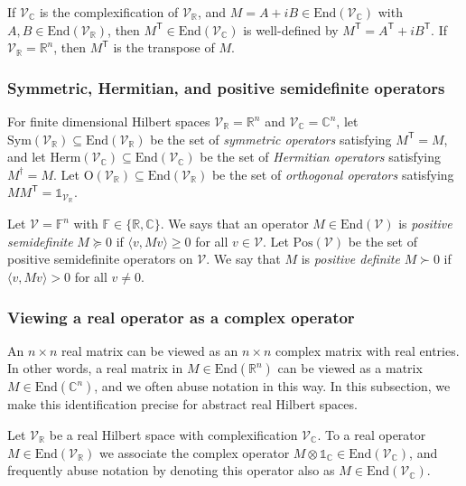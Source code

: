 \documentclass[11pt]{article}
\numberwithin{theorem}{section}
\theoremstyle{definition}
\renewcommand{\t}{{\scriptscriptstyle\mathsf{T}}}
\newcommand{\ip}[2]{\langle #1 , #2\rangle}
\newcommand{\I}{\mathds{1}}
\newcommand{\setft}[1]{\mathrm{#1}}
\newcommand{\Pos}{\setft{Pos}}
\newcommand{\Herm}{\setft{Herm}}
\newcommand{\Sym}{\setft{Sym}}
\newcommand{\complex}{\mathbb{C}}
\newcommand{\field}{\mathbb{F}}
\newcommand{\real}{\mathbb{R}}
\newcommand\V{\mathcal{V}}
\newcommand{\End}{\setft{End}}
\newcommand{\dg}{\dagger}
\newcommand{\Vc}{\V_{\complex}}
\newcommand{\Vr}{\V_{\real}}
\begin{document}
If $\Vc$ is the complexification of $\Vr$, and $M=A+iB \in \End(\Vc)$ with $A,B \in \End(\Vr)$, then $M^{\t} \in \End(\Vc)$ is well-defined by $M^{\t}=A^{\t}+iB^{\t}$. If $\Vr=\real^n$, then $M^{\t}$ is the transpose of $M$.



\subsubsection*{Symmetric, Hermitian, and positive semidefinite operators}

For finite dimensional Hilbert spaces $\Vr=\real^n$ and $ \Vc=\complex^n$, let $\Sym(\Vr) \subseteq \End(\Vr)$ be the set of \textit{symmetric operators} satisfying $M^{\t}=M$, and let $\Herm(\Vc) \subseteq \End(\Vc)$ be the set of \textit{Hermitian operators} satisfying $M^{\dg}=M$. Let $\setft{O}(\Vr) \subseteq \End(\Vr)$ be the set of \textit{orthogonal operators} satisfying $M M^{\t}=\I_{\Vr}$.



Let $\V=\field^n$ with $\field \in \{\real, \complex\}$. We says that an operator $M\in \End(\V)$ is \textit{positive semidefinite} $M \succeq 0$ if $\ip{v}{Mv} \geq 0$ for all $v \in \V$. Let $\Pos(\V)$ be the set of positive semidefinite operators on $\V$. We say that $M$ is \textit{positive definite} $M \succ 0$ if $\ip{v}{Mv} > 0$ for all $v \neq 0$.


\subsubsection*{Viewing a real operator as a complex operator}

An $n \times n$ real matrix can be viewed as an $n \times n$ complex matrix with real entries. In other words, a real matrix in $M\in \End(\real^n)$ can be viewed as a matrix $M \in \End(\complex^n)$, and we often abuse notation in this way. In this subsection, we make this identification precise for abstract real Hilbert spaces.


Let $\Vr$ be a real Hilbert space with complexification $\Vc$. To a real operator $M \in \End(\Vr)$ we associate the complex operator $M \otimes \I_{\complex} \in \End(\Vc)$, and frequently abuse notation by denoting this operator also as $M \in \End(\Vc)$. %
\end{document}
